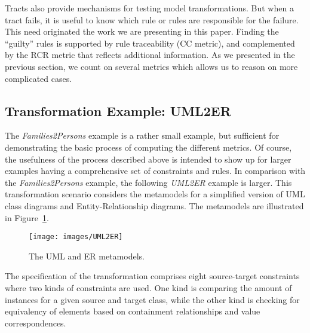 
Tracts also provide mechanisms for testing model transformations. But when a tract fails, it is useful to know which rule or rules are responsible for the failure. This need originated the work we are presenting in this paper. Finding the ``guilty'' rules is supported by rule traceability (CC metric), and complemented by the RCR metric that reflects additional information. As we presented in the previous section, we count on several metrics which allows us to reason on more complicated cases.

\subsection{Transformation Example: UML2ER}

The \emph{Families2Persons} example is a rather small example, but sufficient for demonstrating the basic process of computing the different metrics. Of course, the usefulness of the process described above is intended to show up for larger examples having a comprehensive set of constraints and rules. In comparison with the \emph{Families2Persons} example, the following \emph{UML2ER} example is larger. This transformation scenario  considers the metamodels for a simplified version of UML class diagrams and Entity-Relationship diagrams. The metamodels are illustrated in Figure~\ref{fig:UML2ER}.

\begin{figure}[t]
\centering
\texttt{[image: images/UML2ER]}
\caption{The UML and ER metamodels.}
\label{fig:UML2ER}
\end{figure}

The specification of the transformation comprises eight source-target constraints where two kinds of constraints are used. One kind is comparing the amount of instances for a given source and target class, while the other kind is checking for equivalency of elements based on containment relationships and value correspondences.

